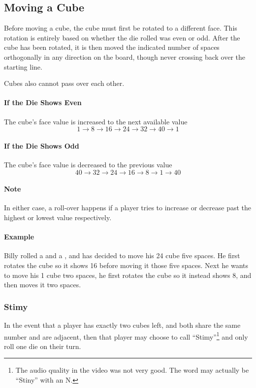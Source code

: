 \subsection{Moving a Cube}
Before moving a cube, the cube must first be rotated to a different face.
This rotation is entirely based on whether the die rolled was even or odd.
After the cube has been rotated, it is then moved the indicated number of spaces orthogonally in any direction on the board, though never crossing back over the starting line.

Cubes also cannot pass over each other.

\paragraph{If the Die Shows Even} The cube's face value is increased to the next available value
$$1 \to 8 \to 16 \to 24 \to 32 \to 40 \to 1$$
\paragraph{If the Die Shows Odd} The cube's face value is decreased to the previous value
$$40 \to 32 \to 24 \to 16 \to 8 \to 1 \to 40$$

\paragraph{Note} In either case, a roll-over happens if a player tries to increase or decrease past the highest or lowest value respectively.

\paragraph{Example} Billy rolled a  and a , and has decided to move his 24 cube five spaces. He first rotates the cube so it shows 16 before moving it those five spaces. Next he wants to move his 1 cube two spaces, he first rotates the cube so it instead shows 8, and then moves it two spaces.

\subsubsection{Stimy}
In the event that a player has exactly two cubes left, and both share the same number and are adjacent, then that player may choose to call ``Stimy''\footnote{The audio quality in the video was not very good. The word may actually be ``Stiny'' with an N.} and only roll one die on their turn.